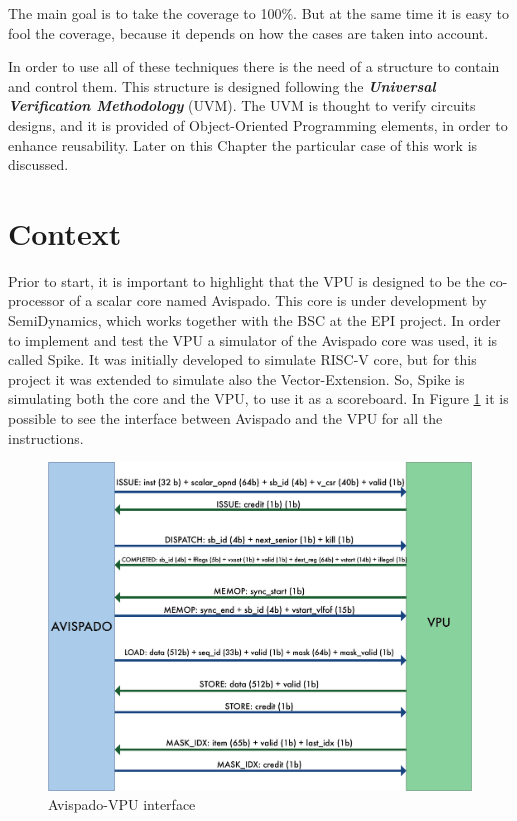 The main goal is to take the coverage to 100\%. But at the same time it is easy to fool the coverage, because it depends on how the cases are taken into account.

In order to use all of these techniques there is the need of a structure to contain and control them.
This structure is designed following the \textbf{\emph{Universal Verification Methodology}} (UVM). The UVM is thought to verify circuits designs, and it is provided of Object-Oriented Programming elements, in order to enhance reusability. Later on this Chapter the particular case of this work is discussed.

\section{Context}
Prior to start, it is important to highlight that the VPU is designed to be the co-processor of a scalar core named Avispado. This core is under development by SemiDynamics, which works together with the BSC at the EPI project. In order to implement and test the VPU a simulator of the Avispado core was used, it is called Spike. It was initially developed to simulate RISC-V core, but for this project it was extended to simulate also the Vector-Extension. So, Spike is simulating both the core and the VPU, to use it as a scoreboard.
In Figure \ref{avi-vpu} it is possible to see the interface between Avispado and the VPU for all the instructions.

\begin{figure}[H]
    \centering
    \includegraphics[scale = 0.6]{Chapter_1/img/avi-vpu.png}
    \caption{Avispado-VPU interface}
    \label{avi-vpu}
\end{figure}


